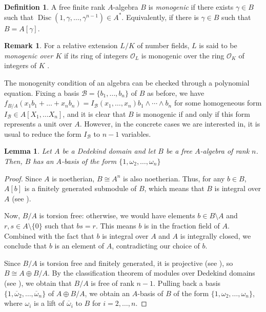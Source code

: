 \documentclass[oneside]{amsart}
\newtheorem{lemma}[X]{Lemma}
\theoremstyle{definition}
\newtheorem{definition}[X]{Definition}
\newtheorem{remark}[X]{Remark}
\begin{document}
\begin{definition}{\cite[Def. 1.2]{ArpinI}}
    A free finite rank $A$-algebra $B$ is \textit{monogenic} if there exists $\gamma\in B$ such that $\operatorname{Disc}(1,\gamma,\dots,\gamma^{n-1})\in A^\ast$. Equivalently, if there is $\gamma\in B$ such that $B=A[\gamma]$.
\end{definition}
 
\begin{remark} 
    For a relative extension  $L/K$ of number fields, $L$ is said to be \textit{monogenic over $K$} if its ring of integers $\mathcal{O}_L$ is monogenic over the ring $\mathcal{O}_K$ of integers of $K$ .
\end{remark}

The monogenity condition of an algebra can be checked through  a polynomial equation. Fixing a basis $\mathcal{B}=\{b_1,\dots, b_n\}$ of $B$ as before, we have $f_{B/A}(x_1 b_1+\dots+x_n b_n)=I_{\mathcal {B}}(x_1,\dots,x_n)b_1\wedge\cdots\wedge b_n$ for some homogeneous form $I_{\mathcal{B}}\in A[X_1,\dots X_n]$, and it is clear that $B$ is monogenic if and only if this form represents a unit over $A$. However, in the concrete cases we are  interested in, it is usual to reduce the form $I_{\mathcal{B}}$ to $n-1$ variables.

\begin{lemma}
    Let $A$ be a Dedekind domain and let $B$ be a free $A$-algebra of rank $n$. Then, $B$ has an $A$-basis of the form $\{1,\omega_2,\dots,\omega_n\}$
\end{lemma}
\begin{proof}
    Since $A$ is noetherian, $B \cong A^n$ is also noetherian. Thus, for any $b \in B$, $A[b]$ is a finitely generated submodule of $B$, which means that $B$ is integral over $A$ (see \cite[Prop. 2.4]{milneANT}). 
    
    Now, $B/A$ is torsion free: otherwise, we would have elements $b \in B\setminus A$ and $r, s \in A\setminus\{0\}$ such that $bs = r$. This means $b$ is in the fraction field of $A$. Combined with the fact that $b$ is integral over $A$ and $A$ is integrally closed, we conclude that $b$ is an element of $A$, contradicting our choice of $b$.

    Since $B/A$ is torsion free and finitely generated, it is projective (see \cite[\S 16.3, Cor. 23]{AAlgebra}), so $B \cong A \oplus B/A$. By the classification theorem of modules over Dedekind domains (see \cite[\S 16.2, Thm. 22]{AAlgebra}), we obtain that $B/A$ is free of rank $n - 1$. Pulling back  a basis $\{1,\overline{\omega}_2,\dots, \overline{\omega}_n\}$ of $A\oplus B/A$, we obtain an $A$-basis of $B$ of the form $\{1, \omega_2,\dots, \omega_n\}$, where $\omega_i$ is a lift of $\overline{\omega}_i$ to $B$ for $i = 2, \dots, n$.
\end{proof}
\end{document}

